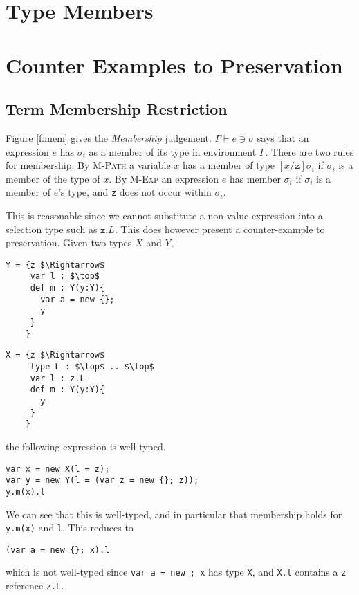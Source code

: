 \documentclass{llncs}
\begin{document}
\section{Type Members}

\section{Counter Examples to Preservation}
	\label{s:examples}

\subsection{Term Membership Restriction}
Figure \ref{f:mem} gives the \emph{Membership} judgement. 
$\Gamma \vdash e \ni \sigma$ says that an expression $e$ 
has $\sigma_i$ as a member of its type in environment $\Gamma$. 
There are two rules for membership. By \textsc{M-Path} a 
variable $x$ has a member of type $[x/\texttt{z}]\sigma_i$ 
if $\sigma_i$ is a member of the type of $x$. By \textsc{M-Exp}
an expression $e$ has member $\sigma_i$ if $\sigma_i$ is 
a member of $e$'s type, and \texttt{z} does not occur 
within $\sigma_i$.

This is reasonable since we cannot substitute a non-value 
expression into a selection type such as $\texttt{z}.L$. 
This does however present a counter-example to preservation. 
Given two types $X$ and $Y$,

\begin{lstlisting}[mathescape, style=custom_lang]
Y = {z $\Rightarrow$
     var l : $\top$
     def m : Y(y:Y){
       var a = new {};
       y
     }
    }
\end{lstlisting}
\begin{lstlisting}[mathescape, style=custom_lang]
X = {z $\Rightarrow$
     type L : $\top$ .. $\top$
     var l : z.L
     def m : Y(y:Y){
       y
     }
    }
\end{lstlisting}

the following expression is well typed.
\begin{lstlisting}[mathescape, style=custom_lang]
var x = new X(l = z);
var y = new Y(l = (var z = new {}; z));
y.m(x).l
\end{lstlisting}
We can see that this is well-typed, and in particular that membership 
holds for \texttt{y.m(x)} and \texttt{l}. This reduces to 
\begin{lstlisting}[mathescape, style=custom_lang]
(var a = new {}; x).l
\end{lstlisting}
which is not well-typed since \texttt{var a = new {}; x} has type 
\texttt{X}, and \texttt{X.l} contains a \texttt{z} reference 
\texttt{z.L}.
\end{document}
